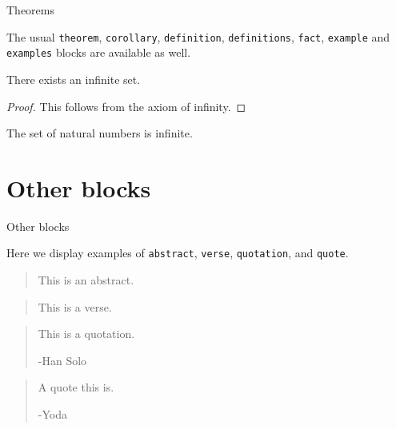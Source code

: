 \documentclass[usenames,dvipsnames,10pt,aspectratio=169]{beamer}
\begin{document}
\begin{frame}{Theorems}

The usual \texttt{theorem}, \texttt{corollary}, \texttt{definition}, \texttt{definitions}, \texttt{fact}, \texttt{example} and \texttt{examples} blocks are available as well.

\begin{theorem}
There exists an infinite set.
\end{theorem}
\begin{proof}
This follows from the axiom of infinity.
\end{proof}
\begin{example}
The set of natural numbers is infinite. 
\end{example}

\end{frame}

\section{Other blocks}

\begin{frame}{Other blocks}

Here we display examples of \texttt{abstract}, \texttt{verse}, \texttt{quotation}, and \texttt{quote}.

\vskip 0.5cm

\begin{abstract}
This is an abstract.
\end{abstract}
\begin{verse}
This is a verse.
\end{verse}
\begin{quotation}
This is a quotation.

\raggedleft -Han Solo
\end{quotation}
\begin{quote}
A quote this is.

\raggedleft -Yoda
\end{quote}

\end{frame}
\end{document}
